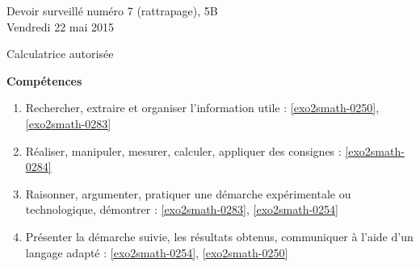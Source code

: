 \documentclass[a4paper,10pt]{article}
\begin{document}
\begin{feuilleDS}{Devoir surveillé numéro 7 (rattrapage), 5B\\ \small Vendredi 22 mai 2015}
    \begin{center}
        Calculatrice autorisée
    \end{center}
\vspace{1cm}
{\bf Compétences}
\small
\begin{enumerate}
    \item
        Rechercher, extraire et organiser l'information utile : \ref{exo2smath-0250}, \ref{exo2smath-0283}
    \item
        Réaliser, manipuler, mesurer, calculer, appliquer des consignes : \ref{exo2smath-0284}
    \item
        Raisonner, argumenter, pratiquer une démarche expérimentale ou technologique, démontrer : \ref{exo2smath-0283}, \ref{exo2smath-0254}
    \item 
        Présenter la démarche suivie, les résultats obtenus, communiquer à l'aide d’un langage adapté : \ref{exo2smath-0254}, \ref{exo2smath-0250}
\end{enumerate}
\end{feuilleDS}
\end{document}
